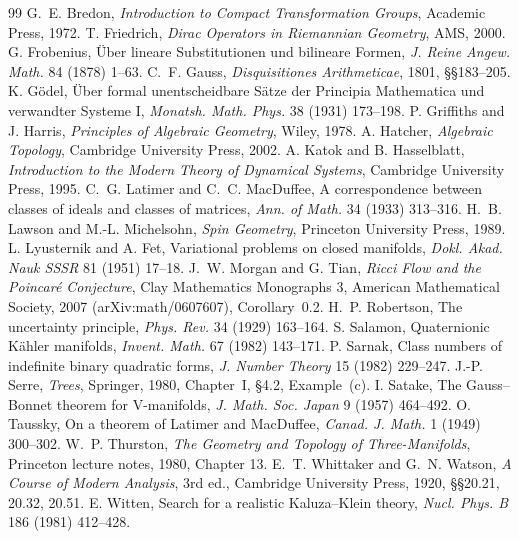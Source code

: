 \documentclass[11pt,a4paper]{article}
\theoremstyle{plain}
\theoremstyle{definition}
\theoremstyle{remark}
\begin{document}
\begin{thebibliography}{99}
 G.~E. Bredon, \emph{Introduction to Compact Transformation Groups}, Academic Press, 1972.
 T. Friedrich, \emph{Dirac Operators in Riemannian Geometry}, AMS, 2000.
 G. Frobenius, \"Uber lineare Substitutionen und bilineare Formen, \emph{J. Reine Angew. Math.} 84 (1878) 1--63.
 C.~F. Gauss, \emph{Disquisitiones Arithmeticae}, 1801, \S\S183--205.
 K. G\"odel, \"Uber formal unentscheidbare S\"atze der Principia Mathematica und verwandter Systeme I, \emph{Monatsh. Math. Phys.} 38 (1931) 173--198.
 P. Griffiths and J. Harris, \emph{Principles of Algebraic Geometry}, Wiley, 1978.
 A. Hatcher, \emph{Algebraic Topology}, Cambridge University Press, 2002.
 A. Katok and B. Hasselblatt, \emph{Introduction to the Modern Theory of Dynamical Systems}, Cambridge University Press, 1995.
 C.~G. Latimer and C.~C. MacDuffee, A correspondence between classes of ideals and classes of matrices, \emph{Ann. of Math.} 34 (1933) 313--316.
 H.~B. Lawson and M.-L. Michelsohn, \emph{Spin Geometry}, Princeton University Press, 1989.
 L. Lyusternik and A. Fet, Variational problems on closed manifolds, \emph{Dokl. Akad. Nauk SSSR} 81 (1951) 17--18.
 J.~W. Morgan and G. Tian, \emph{Ricci Flow and the Poincar\'e Conjecture}, Clay Mathematics Monographs 3, American Mathematical Society, 2007 (arXiv:math/0607607), Corollary~0.2.
 H.~P. Robertson, The uncertainty principle, \emph{Phys. Rev.} 34 (1929) 163--164.
 S. Salamon, Quaternionic K\"ahler manifolds, \emph{Invent. Math.} 67 (1982) 143--171.
 P. Sarnak, Class numbers of indefinite binary quadratic forms, \emph{J. Number Theory} 15 (1982) 229--247.
 J.-P. Serre, \emph{Trees}, Springer, 1980, Chapter~I, \S4.2, Example~(c).
 I. Satake, The Gauss--Bonnet theorem for V-manifolds, \emph{J. Math. Soc. Japan} 9 (1957) 464--492.
 O. Taussky, On a theorem of Latimer and MacDuffee, \emph{Canad. J. Math.} 1 (1949) 300--302.
 W.~P. Thurston, \emph{The Geometry and Topology of Three-Manifolds}, Princeton lecture notes, 1980, Chapter 13.
 E.~T. Whittaker and G.~N. Watson, \emph{A Course of Modern Analysis}, 3rd ed., Cambridge University Press, 1920, \S\S20.21, 20.32, 20.51.
 E. Witten, Search for a realistic Kaluza--Klein theory, \emph{Nucl. Phys. B} 186 (1981) 412--428.
\end{thebibliography}
\end{document}
